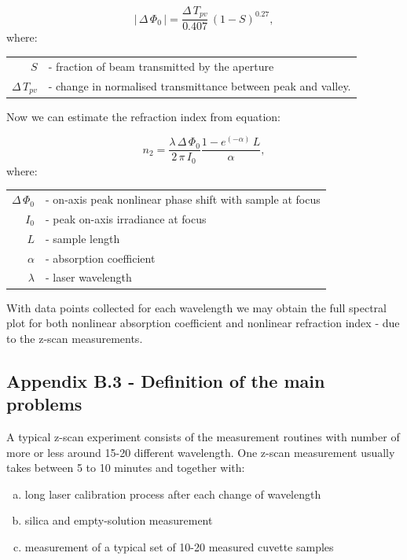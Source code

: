 \documentclass[12pt,twoside,a4paper]{article}
\numberwithin{equation}{subsection}
\numberwithin{figure}{subsection}
\begin{document}
\begin{equation} \label{eq:nlo_onaxisshift}
  \left| \! \,\Delta \,{\Phi_{0}}\, \!  \right| =\frac {\Delta \,{T_{pv}}}{0.407}\,(1 - S)^{0.27},
\end{equation}
where: 
\begin{tabular}{ r l}
  $S$ & - fraction of beam transmitted by the aperture \\
  $\Delta \,{T_{pv}}$ & - change in normalised transmittance between peak and valley. \\ 
\end{tabular}

Now we can estimate the refraction index from equation:

\begin{equation} \label{eq:nlo_estrefindex}
  {n_{2}}=\frac {\lambda \,\Delta \,{\Phi_{0}}}{2\,\pi \,{I_{0}}\,}\frac {1 - e^{( - \alpha )}\,L}{\alpha },
\end{equation}
where: 
\begin{tabular}{ r l}
  $\Delta \,{\Phi_{0}}$ & - on-axis peak nonlinear phase shift with sample at focus \\
  ${I_{0}}$  & - peak on-axis irradiance at focus \\
  $L$ & - sample length \\
  $\alpha $ & - absorption coefficient \\
  $\lambda $  & - laser wavelength \\
\end{tabular}

With data points collected for each wavelength we may obtain the full spectral plot for both nonlinear absorption coefficient and
nonlinear refraction index - due to the z-scan measurements.

\subsection*{Appendix B.3 - Definition of the main problems} \label{chap:zscan_problems}

A typical z-scan experiment consists of the measurement routines with number of more or less around 15-20 different wavelength. One
z-scan measurement usually takes between 5 to 10 minutes and together with:
\begin{enumerate}[(a)]
  \item long laser calibration process after each change of wavelength
  \item silica and empty-solution measurement
  \item measurement of a typical set of 10-20 measured cuvette samples 
\end{enumerate}
\end{document}
